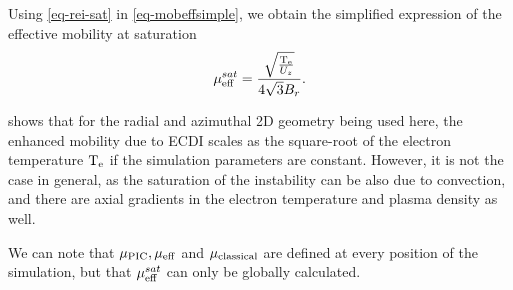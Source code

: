   Using \cref{eq-rei-sat} in \cref{eq-mobeffsimple}, we obtain the simplified expression of the effective mobility at saturation
  \begin{equation} \label{eq-mobeffsat}
    \mu_{\mathrm{eff}}^{sat} = \frac{\sqrt{\frac{\mathrm{T_e}}{U_z}}}{4\sqrt{3}B_r}.
  \end{equation}
  
   shows that for the radial and azimuthal \ac{2D} geometry being used here, the enhanced mobility due to \ac{ECDI} scales as the square-root of the electron temperature $\mathrm{T_e}$ if the simulation parameters are constant.
  However, it is not the case in general, as the saturation of the instability can be also due to convection, and there are axial gradients in the electron temperature and plasma density as well.
  
  We can note that $\mu_{\mathrm{PIC}}, \mu_{\mathrm{eff}}$ and $\mu_{\mathrm{classical}}$ are defined at every position of the simulation, but that $\mu_{\mathrm{eff}}^{sat}$ can only be globally calculated. 
  
  
  
  
  